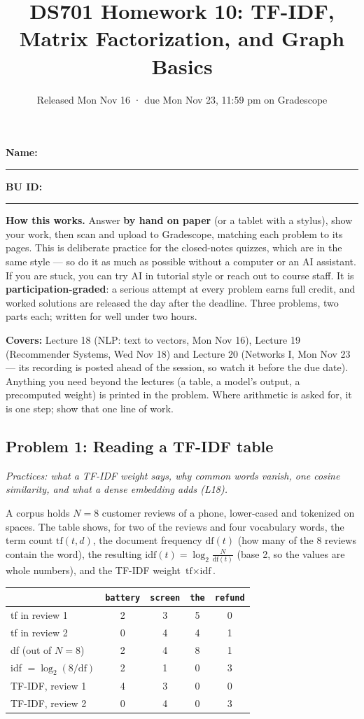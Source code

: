 \documentclass[
  11pt,
]{article}
\title{DS701 Homework 10: TF-IDF, Matrix Factorization, and Graph
Basics}
\subtitle{Released Mon Nov 16 · due Mon Nov 23, 11:59 pm on Gradescope}
\author{}
\date{}
\begin{document}
\maketitle


\noindent\textbf{Name:}\ \rule{2.0in}{0.4pt}\qquad\textbf{BU ID:}\ \rule{1.2in}{0.4pt}
\vspace{6pt}

\textbf{How this works.} Answer \textbf{by hand on paper} (or a tablet
with a stylus), show your work, then scan and upload to Gradescope,
matching each problem to its pages. This is deliberate practice for the
closed-notes quizzes, which are in the same style --- so do it as much
as possible without a computer or an AI assistant. If you are stuck, you
can try AI in tutorial style or reach out to course staff. It is
\textbf{participation-graded}: a serious attempt at every problem earns
full credit, and worked solutions are released the day after the
deadline. Three problems, two parts each; written for well under two
hours.

\textbf{Covers:} Lecture 18 (NLP: text to vectors, Mon Nov 16), Lecture
19 (Recommender Systems, Wed Nov 18) and Lecture 20 (Networks I, Mon Nov
23 --- its recording is posted ahead of the session, so watch it before
the due date). Anything you need beyond the lectures (a table, a model's
output, a precomputed weight) is printed in the problem. Where
arithmetic is asked for, it is one step; show that one line of work.

\subsection{Problem 1: Reading a TF-IDF
table}\label{problem-1-reading-a-tf-idf-table}

\emph{Practices: what a TF-IDF weight says, why common words vanish, one
cosine similarity, and what a dense embedding adds (L18).}

A corpus holds \(N = 8\) customer reviews of a phone, lower-cased and
tokenized on spaces. The table shows, for two of the reviews and four
vocabulary words, the term count \(\text{tf}(t,d)\), the document
frequency \(\text{df}(t)\) (how many of the 8 reviews contain the word),
the resulting \(\text{idf}(t) = \log_2\frac{N}{\text{df}(t)}\) (base 2,
so the values are whole numbers), and the TF-IDF weight
\(\text{tf}\times\text{idf}\).

\begin{center}
\begin{tabular}{@{}l cccc@{}}\toprule
 & \texttt{battery} & \texttt{screen} & \texttt{the} & \texttt{refund}\\ \midrule
tf in review 1 & 2 & 3 & 5 & 0\\
tf in review 2 & 0 & 4 & 4 & 1\\ \midrule
df (out of $N=8$) & 2 & 4 & 8 & 1\\
idf $=\log_2(8/\text{df})$ & 2 & 1 & 0 & 3\\ \midrule
TF-IDF, review 1 & 4 & 3 & 0 & 0\\
TF-IDF, review 2 & 0 & 4 & 0 & 3\\
\bottomrule\end{tabular}\end{center}
\end{document}
